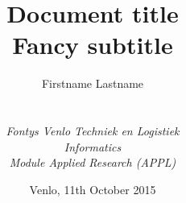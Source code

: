 
\def\Company{Project 2}
\def\Institute{\textit{Fontys Venlo Techniek en Logistiek}}
\def\Course{\textit{Informatics}}
\def\Module{\textit{Module Applied Research (APPL)}}

\def\BoldTitle{Document title}
\def\Subtitle{Fancy subtitle}
\def\Authors{Firstname Lastname}


\title{\textbf{\BoldTitle}\\\Subtitle}
\author{\Authors \\ \\ \\ \Institute\\ \Course\\ \Module}
\date{Venlo, 11th October 2015}
